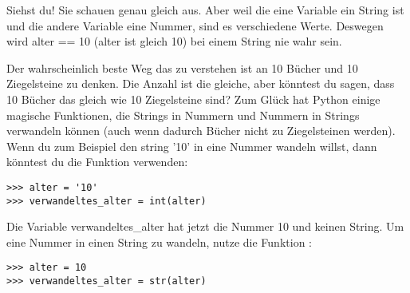 Siehst du! Sie schauen genau gleich aus. Aber weil die eine Variable ein String ist und die andere Variable eine Nummer, sind es verschiedene Werte. Deswegen wird alter == 10 (alter ist gleich 10) bei einem String nie wahr sein. 
\par
Der wahrscheinlich beste Weg das zu verstehen ist an 10 Bücher und 10 Ziegelsteine zu denken. Die Anzahl ist die gleiche, aber könntest du sagen, dass 10 Bücher das gleich wie 10 Ziegelsteine sind? Zum Glück hat Python einige magische Funktionen, die Strings in Nummern und Nummern in Strings verwandeln können (auch wenn dadurch Bücher nicht zu Ziegelsteinen werden). Wenn du zum Beispiel den string '10' in eine Nummer wandeln willst, dann könntest du die Funktion  verwenden:

\begin{listing}
\begin{verbatim}
>>> alter = '10'
>>> verwandeltes_alter = int(alter)
\end{verbatim}
\end{listing}

\noindent
Die Variable verwandeltes\_alter hat jetzt die Nummer 10 und keinen String. Um eine Nummer in einen String zu wandeln, nutze die Funktion :

\begin{listing}
\begin{verbatim}
>>> alter = 10
>>> verwandeltes_alter = str(alter)
\end{verbatim}
\end{listing}

